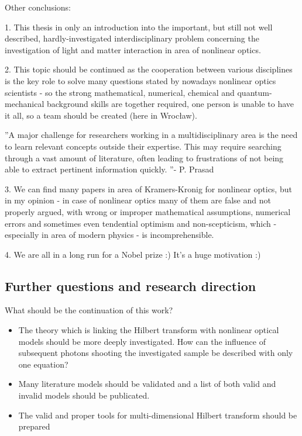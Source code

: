 \documentclass[12pt,twoside,a4paper]{article}
\numberwithin{equation}{subsection}
\numberwithin{figure}{subsection}
\begin{document}
Other conclusions:


1. This thesis in only an introduction into the important, but still not well described, hardly-investigated interdisciplinary
problem concerning the investigation of light and matter interaction in area of nonlinear optics. 

2. This topic should be continued as the cooperation between various disciplines is the key role to solve many questions stated
by nowadays nonlinear optics scientists - so the strong mathematical, numerical, chemical and quantum-mechanical background skills
are together required, one person is unable to have it all, so a team should be created (here in Wrocław).

''A major challenge for researchers working in a multidisciplinary area is the need to learn relevant concepts outside their
expertise. This may require searching through a vast amount of literature, often leading to frustrations of not being able to
extract pertinent information quickly. ''- P. Prasad \cite{prasad_nanophotonics}

3. We can find many papers in area of Kramers-Kronig for nonlinear optics, but in my opinion - in case of nonlinear optics many of
them are false and not properly argued, with wrong or improper mathematical assumptions, numerical errors and sometimes even
tendential optimism and non-scepticism, which - especially in area of modern physics - is incomprehensible.

4. We are all in a long run for a Nobel prize :) It's a huge motivation :)

\subsection{Further questions and research direction} \label{chap:conclusion_further}

What should be the continuation of this work?

\begin{itemize} 
	\item The theory which is linking the Hilbert transform with nonlinear optical models should be more deeply investigated. How can
	the influence of subsequent photons shooting the investigated sample be described with only one equation?
	\item Many literature models should be validated and a list of both valid and invalid models should be publicated.
	\item The valid and proper tools for multi-dimensional Hilbert transform should be prepared
\end{itemize}
\end{document}

